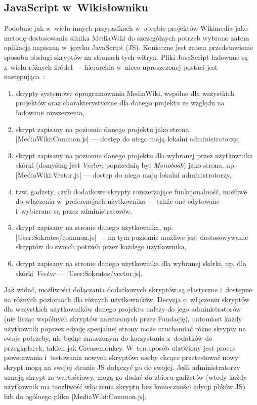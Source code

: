 \subsection{JavaScript w~Wikisłowniku}
Podobnie jak w~wielu innych przypadkach w~obrębie projektów Wikimedia jako metodę dostosowania silnika MediaWiki do szczególnych potrzeb wybrano zatem aplikację napisaną w~języku JavaScript (JS). Konieczne jest zatem przedstawienie sposobu obsługi skryptów na stronach tych witryn. Pliki JavaScript ładowane są z~wielu różnych źródeł --- hierarchia w~nieco uproszczonej postaci jest następująca~\cite{de:js}:
\begin{enumerate}
	\item skrypty systemowe oprogramowania MediaWiki, wspólne dla wszystkich projektów oraz charakterystyczne dla danego projektu ze względu na ładowane rozszerzenia,
	\item skrypt zapisany na poziomie danego projektu jako strona \kod|MediaWiki:Common.js| --- dostęp do niego mają lokalni administratorzy,
	\item skrypt zapisany na poziomie danego projektu dla wybranej przez użytkownika skórki (domyślną jest \emph{Vector}, poprzednią był \emph{Monobook}) jako strona, np. \kod|MediaWiki:Vector.js| --- dostęp do niego mają lokalni administratorzy,
	\item tzw. gadżety, czyli dodatkowe skrypty rozszerzające funkcjonalność, możliwe do włączenia w~preferencjach użytkownika --- także one edytowane i~wybierane są przez administratorów,
	\item skrypt zapisany na stronie danego użytkownika, np. \kod|User:Sokrates/common.js| --- na tym poziomie możliwe jest dostosowywanie skryptów do swoich potrzeb przez każdego użytkownika,
	\item skrypt zapisany na stronie danego użytkownika dla wybranej skórki, np. dla skórki \emph{Vector} --- \kod|User:Sokrates/vector.js|.
\end{enumerate}
Jak widać, możliwości dołączania dodatkowych skryptów są elastyczne i~dostępne na różnych poziomach dla różnych użytkowników. Decyzja o~włączeniu skryptów dla wszystkich użytkowników danego projektu należy do jego administratorów (nie licząc wspólnych skryptów narzuconych przez Fundację), natomiast każdy użytkownik poprzez edycję specjalnej strony może uruchamiać różne skrypty na swoje potrzeby, nie będąc zmuszonym do korzystania z~dodatków do przeglądarek, takich jak Greasemonkey. W~ten sposób ułatwiony jest proces powstawania i~testowania nowych skryptów: osoby chcące przetestować nowy skrypt mogą na swojej stronie JS dołączyć go do swojej. Jeśli administratorzy uznają skrypt za wartościowy, mogą go dodać do zbioru gadżetów (wtedy każdy użytkownik ma możliwość włączenia skryptu bez konieczności edycji plików JS) lub do ogólnego pliku \kod|MediaWiki:Common.js|.

